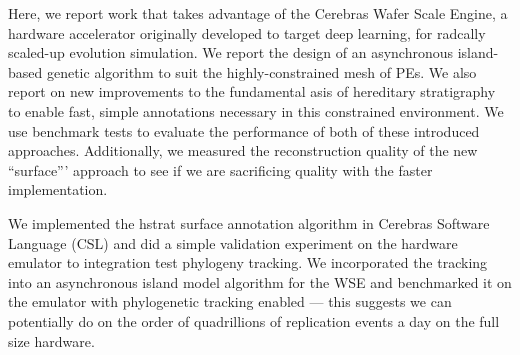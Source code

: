 Here, we report work that takes advantage of the Cerebras Wafer Scale Engine, a hardware accelerator originally developed to target deep learning, for radcally scaled-up evolution simulation.
We report the design of an asynchronous island-based genetic algorithm to suit the highly-constrained mesh of PEs.
We also report on new improvements to the fundamental asis of hereditary stratigraphy to enable fast, simple annotations necessary in this constrained environment.
We use benchmark tests to evaluate the performance of both of these introduced approaches.
Additionally, we measured the reconstruction quality of the new ``surface''' approach to see if we are sacrificing quality with the faster implementation.

We implemented the hstrat surface annotation algorithm in Cerebras Software Language (CSL) and did a simple validation experiment on the hardware emulator to integration test phylogeny tracking.
We incorporated the tracking into an asynchronous island model algorithm for the WSE and benchmarked it on the emulator with phylogenetic tracking enabled --- this suggests we can potentially do on the order of quadrillions of replication events a day on the full size hardware.



